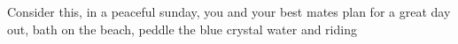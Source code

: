 Consider this, in a peaceful sunday, you and your best mates plan for a great day out, bath on the beach, peddle the blue crystal water and riding 
